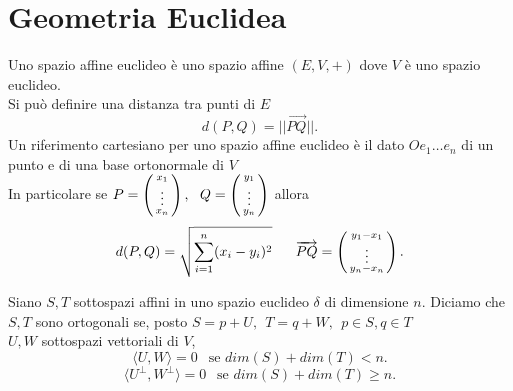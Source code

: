 \documentclass[12px]{article}
\begin{document}
\section{Geometria Euclidea}
Uno spazio affine euclideo è uno spazio affine $(E,V, +)$ dove $V$ è uno spazio euclideo.\\
Si può definire una distanza tra punti di $E$ 
\[
 d(P,Q) = ||\overrightarrow{PQ}||
.\] 
Un riferimento cartesiano per uno spazio affine euclideo è il dato $Oe_1\ldots e_n$ di un punto e di una base ortonormale di $V$\\
In particolare se $P = \left(\begin{smallmatrix} x_1\\\vdots\\x_n\end{smallmatrix}\right), \ \ Q = \left(\begin{smallmatrix}y_1\\\vdots\\y_n\end{smallmatrix}\right)$ allora
\[
	d(P,Q) = \sqrt{\sum^n_{i=1}(x_i - y_i)^2}\ \ \ \ \ \overrightarrow{PQ} = \icol{y_1 - x_1\\ \vdots \\ y_n - x_n}
.\] 
\begin{defi}
	Siano $S,T$ sottospazi affini in uno spazio euclideo $\delta$ di dimensione $n$. Diciamo che $S,T$ sono ortogonali se, posto $S = p + U, \ \ T= q + W, \ \ p\in S,q\in T$\\
	 $U,W$ sottospazi vettoriali di $V$,
	 \[
		 \langle U, W \rangle = 0\ \ \text{ se } dim(S) + dim(T) < n
	 .\] 
	 \[
		 \langle U^\perp, W^\perp \rangle  = 0 \ \ \text{ se } dim(S) + dim(T) \geq n
	 .\] 
\end{defi}
\end{document}
